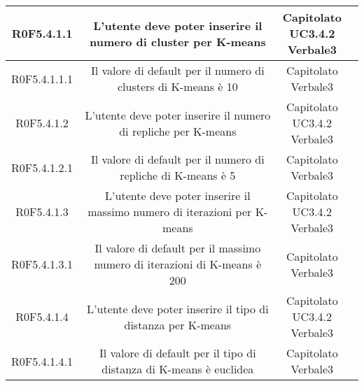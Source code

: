 \begin{center}
\begin{longtable}{|c|c|c|c|}
\hline
R0F5.4.1.1   & \parbox[t]{\larghezza}{L'utente deve poter inserire il numero di cluster\glossario{} per K-means\glossario{}}  & \parbox[t]{\dimFonti}{ Capitolato \\ UC3.4.2 \\ Verbale3 \\} \\
\hline
R0F5.4.1.1.1   & \parbox[t]{\larghezza}{Il valore di default per il numero di clusters di K-means\glossario{} è 10}  & \parbox[t]{\dimFonti}{ Capitolato \\ Verbale3 \\} \\
\hline
R0F5.4.1.2   & \parbox[t]{\larghezza}{L'utente deve poter inserire il numero di repliche per K-means\glossario{}}  & \parbox[t]{\dimFonti}{ Capitolato \\ UC3.4.2 \\ Verbale3 \\} \\
\hline
R0F5.4.1.2.1   & \parbox[t]{\larghezza}{Il valore di default per il numero di repliche di K-means\glossario{} è 5}  & \parbox[t]{\dimFonti}{ Capitolato \\ Verbale3 \\} \\
\hline
R0F5.4.1.3   & \parbox[t]{\larghezza}{L'utente deve poter inserire il massimo numero di iterazioni per K-means\glossario{}}  & \parbox[t]{\dimFonti}{ Capitolato \\ UC3.4.2 \\ Verbale3 \\} \\
\hline
R0F5.4.1.3.1   & \parbox[t]{\larghezza}{Il valore di default per il massimo numero di iterazioni di K-means\glossario{} è 200}  & \parbox[t]{\dimFonti}{ Capitolato \\ Verbale3 \\} \\
\hline
R0F5.4.1.4   & \parbox[t]{\larghezza}{L'utente deve poter inserire il tipo di distanza per K-means\glossario{}}  & \parbox[t]{\dimFonti}{ Capitolato \\ UC3.4.2 \\ Verbale3 \\} \\
\hline
R0F5.4.1.4.1   & \parbox[t]{\larghezza}{Il valore di default per il tipo di distanza di K-means\glossario{} è euclidea}  & \parbox[t]{\dimFonti}{ Capitolato \\ Verbale3 \\} \\

\end{longtable}
\end{center}

